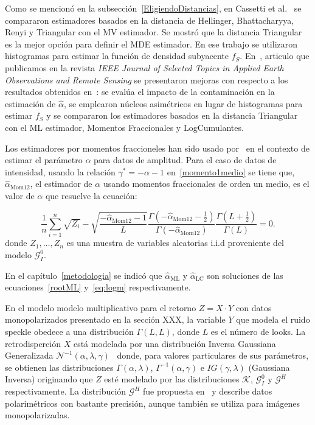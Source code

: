 Como se mencionó en la subsección~\ref{EligiendoDistancias}, en Cassetti et al.~\cite{APSAR2013ParameterEstimationStochasticDistances} se compararon estimadores basados en la distancia de Hellinger, Bhattacharyya, Renyi y Triangular con el MV estimador. Se mostró que la distancia Triangular es la mejor opción para definir el MDE estimador. En ese trabajo se utilizaron histogramas para estimar la función de densidad subyacente $f_S$. En~\cite{gambini2015}, articulo que publicamos en la revista \textit{IEEE Journal of Selected Topics in Applied Earth Observations and
Remote Sensing} se presentaron mejoras con respecto a los resultados obtenidos en~\cite{APSAR2013ParameterEstimationStochasticDistances}: se evalúa el impacto de la contaminación en la estimación de $\widehat{\alpha}$, se emplearon núcleos asimétricos en lugar de histogramas para estimar $f_S$ y se compararon los estimadores basados en la distancia Triangular con el ML estimador, Momentos Fraccionales y LogCumulantes. 

Los estimadores por momentos fraccioneles han sido usado por~\cite{Frery97,GambiniSC08} en el contexto de estimar el parámetro $\alpha$ para datos de amplitud. Para el caso de datos de intensidad, usando la relación $\gamma^*=-\alpha-1$ en~\ref{momento1medio} se tiene que, $\widehat{\alpha}_\text{Mom12}$, el estimador de $\alpha$ usando momentos fraccionales de orden un medio, es el valor de $\alpha$ que resuelve la ecuación:

\begin{equation}
\frac{1}{n} \sum_{i=1}^n \sqrt{Z_i} -\sqrt{\frac{-\widehat\alpha_{\text{Mom12}}-1}{L}}\frac{\Gamma ( -\widehat\alpha_{\text{Mom12}}-{\frac{1}{2}} )}{ \Gamma (-\widehat\alpha_{\text{Mom12}}) }
\frac{\Gamma (L+{\frac{1}{2}} )}{\Gamma (L)}=0.
\label{estim_moment1_2_gI0}
\end{equation}
donde $Z_1,\ldots,Z_n$ es una muestra de variables aleatorias i.i.d proveniente del modelo $\mathcal{G}_I^0$.

En el capítulo~\ref{metodologia} se indicó que $\widehat{\alpha}_\text{ML}$ y $\widehat{\alpha}_\text{LC}$ son soluciones de las ecuaciones~\ref{rootML} y~\ref{eq:logm} respectivamente.

En el modelo modelo multiplicativo para el retorno $Z=X \cdot Y$ con datos monopolarizados presentado en la sección XXX, la variable $Y$ que modela el ruido speckle obedece a una distribución $\Gamma(L,L)$, donde $L$ es el número de looks. La retrodisperción $X$ está modelada por una distribución Inversa Gaussiana Generalizada $\mathcal{N}^{-1}( \alpha ,\lambda ,\gamma )$~\cite{Frery97} donde,  para valores particulares de sus parámetros, se obtienen las distribuciones $\Gamma ( \alpha ,\lambda ) $,  $\Gamma ^{-1}( \alpha ,\gamma ) $ e $IG( \gamma ,\lambda ) $ (Gaussiana Inversa) originando que $Z$ esté modelado por las distribuciones $\mathcal{K}$, $\mathcal{G}_I^{0}$ y $\mathcal{G}^{H}$ respectivamente. La distribución $\mathcal{G}^{H}$ fue propuesta en~\cite{harmoniceusar2000} y describe datos  polarimétricos con bastante precisión, aunque
también se utiliza para imágenes monopolarizadas.

